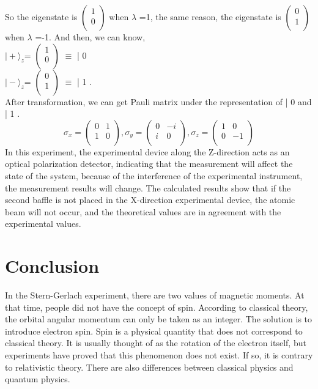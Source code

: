 \documentclass[a4paper]{article}
\newcommand{\ket}[1]{\big|  #1 \big \rangle }
\begin{document}
So the eigenstate is $\begin{pmatrix} 1\\0\\\end{pmatrix} $ when $\lambda$ =1, the same reason, the eigenstate is $\begin{pmatrix} 0\\1\\\end{pmatrix} $ when $\lambda$ =-1.
And then, we can know,\\
$\ket{+}_z$= $\begin{pmatrix} 1\\0\\\end{pmatrix}$ $\equiv$ \ket{0}\\ $\ket{-}_z$= $\begin{pmatrix} 0\\1\\\end{pmatrix}$ $\equiv$ \ket{1}.\\
After transformation, we can get Pauli matrix under the representation of \ket{0} and \ket{1}.
\begin{equation}
\sigma_x=\begin{pmatrix} 0&1\\1&0\\\end{pmatrix},
\sigma_y=\begin{pmatrix} 0&-i\\i&0\\\end{pmatrix},
\sigma_z=\begin{pmatrix} 1&0\\0&-1\\\end{pmatrix}
\end{equation}
\quad In this experiment, the experimental device along the Z-direction acts as an optical polarization detector, indicating that the measurement will affect the state of the system, because of the interference of the experimental instrument, the measurement results will change. The calculated results show that if the second baffle is not placed in the X-direction experimental device, the atomic beam will not occur, and the theoretical values are in agreement with the experimental values.
\cite{sakurai1967advanced}

\section{Conclusion}
\quad In the Stern-Gerlach experiment, there are two values of magnetic moments. At that time, people did not have the concept of spin. According to classical theory, the orbital angular momentum can only be taken as an integer. The solution is to introduce electron spin. Spin is a physical quantity that does not correspond to classical theory. It is usually thought of as the rotation of the electron itself, but experiments have proved that this phenomenon does not exist. If so, it is contrary to relativistic theory. There are also differences between classical physics and quantum physics.



\end{document}
